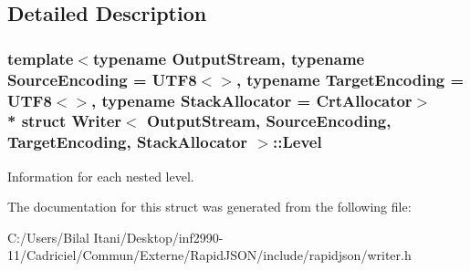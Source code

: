 \subsection{Detailed Description}
\subsubsection*{template$<$typename Output\+Stream, typename Source\+Encoding = U\+T\+F8$<$$>$, typename Target\+Encoding = U\+T\+F8$<$$>$, typename Stack\+Allocator = Crt\+Allocator$>$\\*
struct Writer$<$ Output\+Stream, Source\+Encoding, Target\+Encoding, Stack\+Allocator $>$\+::\+Level}

Information for each nested level. 

The documentation for this struct was generated from the following file\+:\begin{DoxyCompactItemize}
\item 
C\+:/\+Users/\+Bilal Itani/\+Desktop/inf2990-\/11/\+Cadriciel/\+Commun/\+Externe/\+Rapid\+J\+S\+O\+N/include/rapidjson/writer.\+h\end{DoxyCompactItemize}
